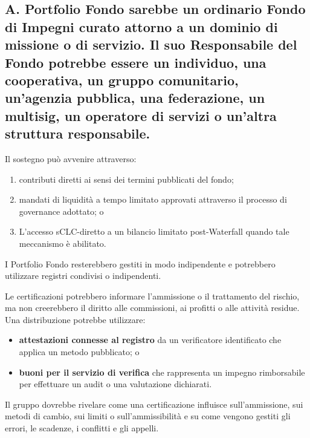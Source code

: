 \documentclass[11pt]{article}
\begin{document}
\subsection*{A. \textbf{Portfolio Fondo} sarebbe un ordinario Fondo di Impegni curato attorno a un dominio di missione o di servizio. Il suo Responsabile del Fondo potrebbe essere un individuo, una cooperativa, un gruppo comunitario, un'agenzia pubblica, una federazione, un multisig, un operatore di servizi o un'altra struttura responsabile.}

Il sostegno può avvenire attraverso:

\begin{enumerate}[leftmargin=*]
\item contributi diretti ai sensi dei termini pubblicati del fondo;
\item mandati di liquidità a tempo limitato approvati attraverso il processo di governance adottato; o
\item L'accesso sCLC-diretto a un bilancio limitato post-Waterfall quando tale meccanismo è abilitato.
\end{enumerate}
I Portfolio Fondo resterebbero gestiti in modo indipendente e potrebbero utilizzare registri condivisi o indipendenti.

Le certificazioni potrebbero informare l'ammissione o il trattamento del rischio, ma non creerebbero il diritto alle commissioni, ai profitti o alle attività residue. Una distribuzione potrebbe utilizzare:

\begin{itemize}[leftmargin=*]
\item \textbf{attestazioni connesse al registro} da un verificatore identificato che applica un metodo pubblicato; o
\item \textbf{buoni per il servizio di verifica} che rappresenta un impegno rimborsabile per effettuare un audit o una valutazione dichiarati.
\end{itemize}
Il gruppo dovrebbe rivelare come una certificazione influisce sull'ammissione, sui metodi di cambio, sui limiti o sull'ammissibilità e su come vengono gestiti gli errori, le scadenze, i conflitti e gli appelli.
\end{document}
